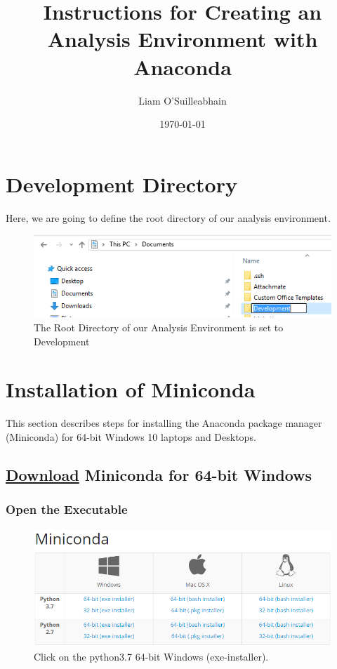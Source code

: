 \documentclass{report}
\title{Instructions for Creating an Analysis Environment with Anaconda}
\author{Liam O'Suilleabhain}
\date{\today}
\begin{document}
\maketitle

\chapter*{Development Directory}

Here, we are going to define the root directory of our analysis environment.

\begin{figure}[H]
\centering
\includegraphics{./images/Development.PNG}
\caption{The Root Directory of our Analysis Environment is set to Development}
\end{figure}


\chapter*{Installation of Miniconda}

\bigskip
This section describes steps for installing the Anaconda package manager (Miniconda) for 64-bit Windows 10 laptops and Desktops. \\

\hypertarget{download-miniconda-3-for-64-bit-windows}{%
\section*{\texorpdfstring{\href{https://conda.io/miniconda.html}{Download} 
Miniconda for 64-bit Windows}{Download Miniconda}}\label{download-miniconda-3-for-64-bit-windows}}

\subsection*{Open the Executable}

\begin{figure}[h!]
\centering
\includegraphics{./images/miniconda3.PNG}
\caption{Click on the python3.7 64-bit Windows (exe-installer).}
\end{figure}
\end{document}
